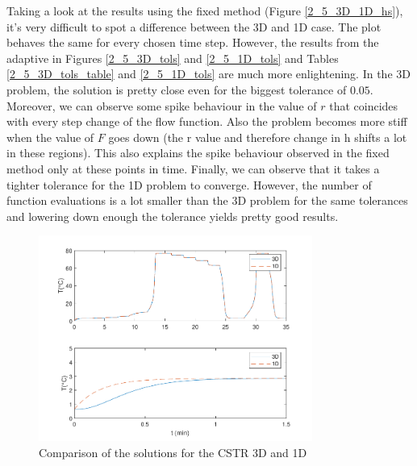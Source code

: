 Taking a look at the results using the fixed method (Figure \ref{2_5_3D_1D_hs}), it's very difficult to spot a difference between the 3D and 1D case. The plot behaves the same for every chosen time step. However, the results from the adaptive in Figures \ref{2_5_3D_tols} and \ref{2_5_1D_tols} and Tables \ref{2_5_3D_tols_table} and \ref{2_5_1D_tols} are much more enlightening. In the 3D problem, the solution is pretty close even for the biggest tolerance of $0.05$. Moreover, we can observe some spike behaviour in the value of $r$ that coincides with every step change of the flow function. Also the problem becomes more stiff when the value of $F$ goes down (the r value and therefore change in h shifts a lot in these regions). This also explains the spike behaviour observed in the fixed method only at these points in time. Finally, we can observe that it takes a tighter tolerance for the 1D problem to converge. However, the number of function evaluations is a lot smaller than the 3D problem for the same tolerances and lowering down enough the tolerance yields pretty good results.

\begin{figure}[H]
    \centering
    \includegraphics[width=0.8\textwidth]{images/2/2_5_3D_vs_1D.pdf}
    \caption{Comparison of the solutions for the CSTR 3D and 1D}
    \label{2_5_3D_vs_1D}
\end{figure}

